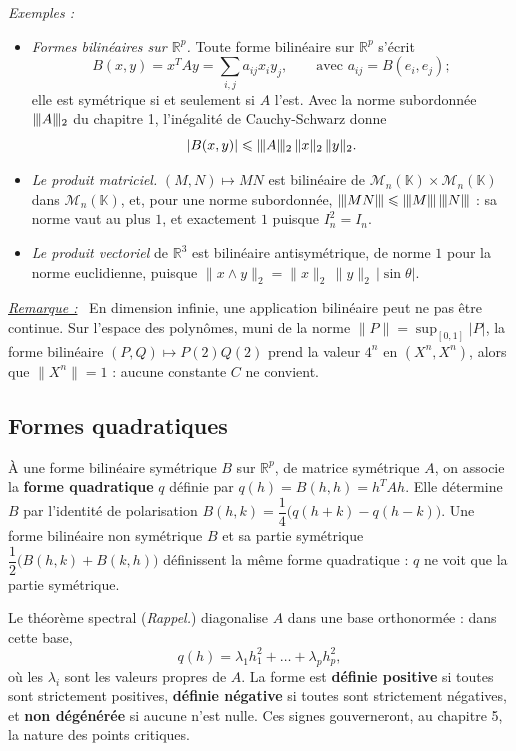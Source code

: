 \documentclass[a4paper,twoside]{report}
\newcommand{\mot}[1]{\textcolor{rougecours}{\textbf{#1}}}
\newenvironment{remarque}%
 {\par\needspace{6\baselineskip}\vspace{1mm}\begin{list}{}{\leftmargin=1cm \rightmargin=0.5cm}\item[]%
  \textit{\underline{Remarque :}}~}%
 {\end{list}\vspace{1mm}}
\newenvironment{exemples}%
 {\par\needspace{6\baselineskip}\vspace{1mm}\begin{list}{}{\leftmargin=1cm \rightmargin=0.5cm}\item[]%
  \textit{Exemples :}%
  \begin{itemize}[label=$\bullet$,leftmargin=0.45cm,topsep=3pt,itemsep=4pt]}%
 {\end{itemize}\end{list}\vspace{1mm}}
\newcommand{\R}{\mathbb{R}}
\newcommand{\K}{\mathbb{K}}                       %
\newcommand{\tra}[1]{{#1}^{T}}                    %
\newcommand{\Mn}[1]{\mathcal{M}_{#1}(\K)}          %
\newcommand{\norme}[1]{\lVert #1 \rVert}         %
\newcommand{\nop}[1]{|\mkern-1.5mu|\mkern-1.5mu|#1|\mkern-1.5mu|\mkern-1.5mu|}   %
\begin{document}
\begin{exemples}
  \item \emph{Formes bilinéaires sur $\R^{p}$.} Toute forme bilinéaire sur $\R^{p}$ s'écrit
  \[ B(x, y) = \tra{x}Ay = \sum_{i, j} a_{ij}x_{i}y_{j}, \qquad \text{avec } a_{ij} = B(e_{i}, e_{j}) ; \] elle est symétrique si et seulement si $A$ l'est. Avec la norme subordonnée $\nop{A}_{2}$ du chapitre 1, l'inégalité de Cauchy-Schwarz donne
  \[ |B(x, y)| \leqslant \nop{A}_{2}\,\norme{x}_{2}\,\norme{y}_{2}. \]
  \item \emph{Le produit matriciel.} $(M, N) \mapsto MN$ est bilinéaire de $\Mn{n} \times \Mn{n}$ dans $\Mn{n}$, et, pour une norme subordonnée, $\nop{MN} \leqslant \nop{M}\,\nop{N}$ : sa norme vaut au plus $1$, et exactement $1$ puisque $I_{n}^{2} = I_{n}$.
  \item \emph{Le produit vectoriel} de $\R^{3}$ est bilinéaire antisymétrique, de norme $1$ pour la norme euclidienne, puisque $\norme{x \wedge y}_{2} = \norme{x}_{2}\,\norme{y}_{2}\,|\sin\theta|$.
\end{exemples}

\begin{remarque}
En dimension infinie, une application bilinéaire peut ne pas être continue. Sur l'espace des polynômes, muni de la norme $\norme{P} = \sup_{[0, 1]} |P|$, la forme bilinéaire $(P, Q) \mapsto P(2)Q(2)$ prend la valeur $4^{n}$ en $(X^{n}, X^{n})$, alors que $\norme{X^{n}} = 1$ : aucune constante $C$ ne convient.
\end{remarque}

\subsection{Formes quadratiques}

À une forme bilinéaire symétrique $B$ sur $\R^{p}$, de matrice symétrique $A$, on associe la \mot{forme quadratique} $q$ définie par $q(h) = B(h, h) = \tra{h}Ah$. Elle détermine $B$ par l'identité de polarisation $B(h, k) = \dfrac{1}{4}\big(q(h + k) - q(h - k)\big)$. Une forme bilinéaire non symétrique $B$ et sa partie symétrique $\dfrac{1}{2}\big(B(h, k) + B(k, h)\big)$ définissent la même forme quadratique : $q$ ne voit que la partie symétrique.

\noindent Le théorème spectral (\emph{Rappel.}) diagonalise $A$ dans une base orthonormée : dans cette base,
\[ q(h) = \lambda_{1}h_{1}^{2} + \dots + \lambda_{p}h_{p}^{2}, \]
où les $\lambda_{i}$ sont les valeurs propres de $A$. La forme est \mot{définie positive} si toutes sont strictement positives, \mot{définie négative} si toutes sont strictement négatives, et \mot{non dégénérée} si aucune n'est nulle. Ces signes gouverneront, au chapitre 5, la nature des points critiques.
\end{document}
